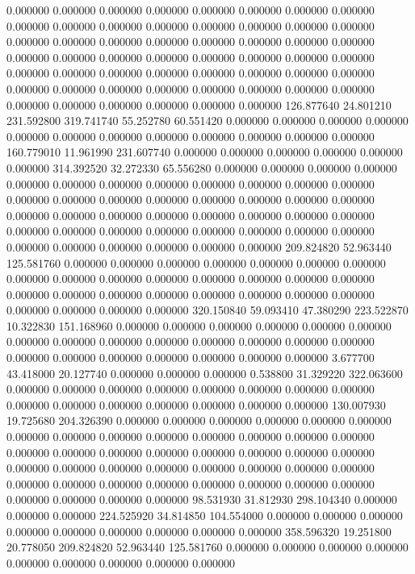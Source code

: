 0.000000 0.000000 0.000000
0.000000 0.000000 0.000000
0.000000 0.000000 0.000000
0.000000 0.000000 0.000000
0.000000 0.000000 0.000000
0.000000 0.000000 0.000000
0.000000 0.000000 0.000000
0.000000 0.000000 0.000000
0.000000 0.000000 0.000000
0.000000 0.000000 0.000000
0.000000 0.000000 0.000000
0.000000 0.000000 0.000000
0.000000 0.000000 0.000000
0.000000 0.000000 0.000000
0.000000 0.000000 0.000000
0.000000 0.000000 0.000000
0.000000 0.000000 0.000000
0.000000 0.000000 0.000000
126.877640 24.801210 231.592800
319.741740 55.252780 60.551420
0.000000 0.000000 0.000000
0.000000 0.000000 0.000000
0.000000 0.000000 0.000000
0.000000 0.000000 0.000000
160.779010 11.961990 231.607740
0.000000 0.000000 0.000000
0.000000 0.000000 0.000000
314.392520 32.272330 65.556280
0.000000 0.000000 0.000000
0.000000 0.000000 0.000000
0.000000 0.000000 0.000000
0.000000 0.000000 0.000000
0.000000 0.000000 0.000000
0.000000 0.000000 0.000000
0.000000 0.000000 0.000000
0.000000 0.000000 0.000000
0.000000 0.000000 0.000000
0.000000 0.000000 0.000000
0.000000 0.000000 0.000000
0.000000 0.000000 0.000000
0.000000 0.000000 0.000000
0.000000 0.000000 0.000000
209.824820 52.963440 125.581760
0.000000 0.000000 0.000000
0.000000 0.000000 0.000000
0.000000 0.000000 0.000000
0.000000 0.000000 0.000000
0.000000 0.000000 0.000000
0.000000 0.000000 0.000000
0.000000 0.000000 0.000000
0.000000 0.000000 0.000000
0.000000 0.000000 0.000000
320.150840 59.093410 47.380290
223.522870 10.322830 151.168960
0.000000 0.000000 0.000000
0.000000 0.000000 0.000000
0.000000 0.000000 0.000000
0.000000 0.000000 0.000000
0.000000 0.000000 0.000000
0.000000 0.000000 0.000000
0.000000 0.000000 0.000000
3.677700 43.418000 20.127740
0.000000 0.000000 0.000000
0.538800 31.329220 322.063600
0.000000 0.000000 0.000000
0.000000 0.000000 0.000000
0.000000 0.000000 0.000000
0.000000 0.000000 0.000000
0.000000 0.000000 0.000000
130.007930 19.725680 204.326390
0.000000 0.000000 0.000000
0.000000 0.000000 0.000000
0.000000 0.000000 0.000000
0.000000 0.000000 0.000000
0.000000 0.000000 0.000000
0.000000 0.000000 0.000000
0.000000 0.000000 0.000000
0.000000 0.000000 0.000000
0.000000 0.000000 0.000000
0.000000 0.000000 0.000000
0.000000 0.000000 0.000000
0.000000 0.000000 0.000000
0.000000 0.000000 0.000000
0.000000 0.000000 0.000000
98.531930 31.812930 298.104340
0.000000 0.000000 0.000000
224.525920 34.814850 104.554000
0.000000 0.000000 0.000000
0.000000 0.000000 0.000000
0.000000 0.000000 0.000000
358.596320 19.251800 20.778050
209.824820 52.963440 125.581760
0.000000 0.000000 0.000000
0.000000 0.000000 0.000000
0.000000 0.000000 0.000000
